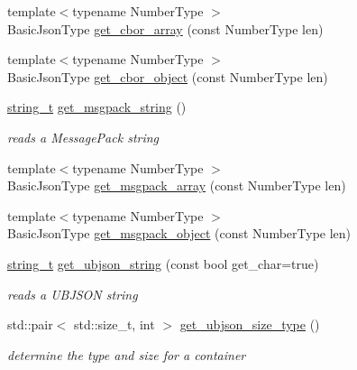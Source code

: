 \begin{DoxyCompactItemize}
{\footnotesize template$<$typename Number\+Type $>$ }\\Basic\+Json\+Type \hyperlink{classnlohmann_1_1detail_1_1binary__reader_a3ee69f0eabc2325477dd00689a00449b}{get\+\_\+cbor\+\_\+array} (const Number\+Type len)
\item 
{\footnotesize template$<$typename Number\+Type $>$ }\\Basic\+Json\+Type \hyperlink{classnlohmann_1_1detail_1_1binary__reader_ac10de53e05ff19b4860c73f52a6871a9}{get\+\_\+cbor\+\_\+object} (const Number\+Type len)
\item 
\hyperlink{classnlohmann_1_1detail_1_1binary__reader_a889a8702ca8aa45e99136bc31ea898e9}{string\+\_\+t} \hyperlink{classnlohmann_1_1detail_1_1binary__reader_aca08d17b5a8230eb6738628934b3b5a5}{get\+\_\+msgpack\+\_\+string} ()
\begin{DoxyCompactList}\small\item\em reads a Message\+Pack string \end{DoxyCompactList}\item 
{\footnotesize template$<$typename Number\+Type $>$ }\\Basic\+Json\+Type \hyperlink{classnlohmann_1_1detail_1_1binary__reader_a7adeb751743afe4233d75d351252bc93}{get\+\_\+msgpack\+\_\+array} (const Number\+Type len)
\item 
{\footnotesize template$<$typename Number\+Type $>$ }\\Basic\+Json\+Type \hyperlink{classnlohmann_1_1detail_1_1binary__reader_a8fd9972d8bbb03b49acbaaf641151859}{get\+\_\+msgpack\+\_\+object} (const Number\+Type len)
\item 
\hyperlink{classnlohmann_1_1detail_1_1binary__reader_a889a8702ca8aa45e99136bc31ea898e9}{string\+\_\+t} \hyperlink{classnlohmann_1_1detail_1_1binary__reader_ae4097317b979174cc366b076bb879814}{get\+\_\+ubjson\+\_\+string} (const bool get\+\_\+char=true)
\begin{DoxyCompactList}\small\item\em reads a U\+B\+J\+S\+ON string \end{DoxyCompactList}\item 
std\+::pair$<$ std\+::size\+\_\+t, int $>$ \hyperlink{classnlohmann_1_1detail_1_1binary__reader_a480aae640bb92a7432c0f758081a2cc7}{get\+\_\+ubjson\+\_\+size\+\_\+type} ()
\begin{DoxyCompactList}\small\item\em determine the type and size for a container \end{DoxyCompactList}\item 

\end{DoxyCompactItemize}
